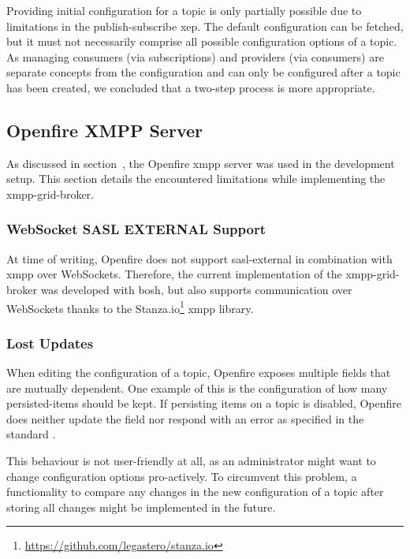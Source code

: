 Providing initial configuration for a \gls{topic} is only partially possible due to limitations in the \gls{publish-subscribe} \gls{xep}.
The default configuration can be fetched, but it must not necessarily comprise all possible configuration options of a \gls{topic}.
As managing consumers (via subscriptions) and providers (via consumers) are separate concepts from the configuration and can only be configured after a \gls{topic} has been created, we concluded that a two-step process is more appropriate.

\subsection{Openfire XMPP Server}\label{sec:limitations-of-the-openfire-xmpp-server}

As discussed in section~, the Openfire \gls{xmpp} server was used in the development setup. This section details the encountered limitations while implementing the \gls{xmpp-grid-broker}.

\subsubsection{WebSocket SASL EXTERNAL Support}

At time of writing, Openfire does not support \gls{sasl-external} in combination with \gls{xmpp} over WebSockets.
Therefore, the current implementation of the \gls{xmpp-grid-broker} was developed with \gls{bosh}, but also supports communication over WebSockets thanks to the Stanza.io\footnote{\url{https://github.com/legastero/stanza.io}} \gls{xmpp} library.

\subsubsection{Lost Updates}\label{sec:lost-updates}

When editing the configuration of a \gls{topic}, Openfire exposes multiple fields that are mutually dependent.
One example of this is the configuration of how many \glspl{persisted-item} should be kept.
If persisting items on a \gls{topic} is disabled, Openfire does neither update the field nor respond with an error as specified in the standard \cite{xep-0060, xep-0004}.

This behaviour is not user-friendly at all, as an administrator might want to change configuration options pro-actively. To circumvent this problem, a functionality to compare any changes in the new configuration of a topic after storing all changes might be implemented in the future.

